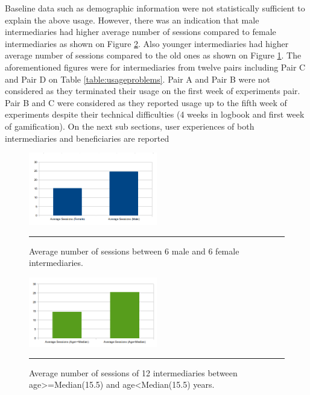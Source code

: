 Baseline data such as demographic information were not statistically sufficient to explain the above usage. However, there was an indication that male intermediaries had higher average number of sessions compared to female intermediaries as shown on Figure \ref{figure:usagegender}.  Also younger intermediaries had higher average number of sessions compared to the old ones as shown on Figure \ref{figure:usageage}. The aforementioned figures were for intermediaries from twelve pairs including Pair C and Pair D on Table \ref{table:usageproblems}. Pair A and Pair B were not considered as they terminated their usage on the first week of experiments pair. Pair B and C were considered as they reported usage up to the fifth week of experiments despite their technical difficulties (4 weeks in logbook and first week of gamification). On the next sub sections, user experiences of both intermediaries and beneficiaries are reported \newline
\begin{figure}[htbp]
  \centering
    \includegraphics[width=0.5\textwidth]{Figures/session_gender.png}
    \rule{35em}{0.5pt}
  \caption{Average number of sessions between 6 male and 6 female intermediaries.}
  \label{figure:usageage}
\end{figure}
\begin{figure}[htbp]
  \centering
    \includegraphics[width=0.5\textwidth]{Figures/session_age.png}
    \rule{35em}{0.5pt}
  \caption{Average number of sessions of 12 intermediaries between age\textgreater=Median(15.5) and age\textless Median(15.5) years.}
  \label{figure:usagegender}
\end{figure}\newline
